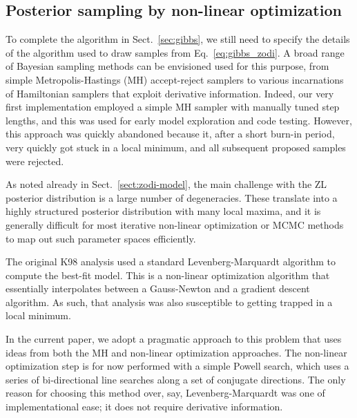 \documentclass[twocolumn]{aa}
\begin{document}
\subsection{Posterior sampling by non-linear optimization}
\label{sec:nonlin}


To complete the algorithm in Sect.~\ref{sec:gibbs}, we still need to
specify the details of the algorithm used to draw samples from
Eq.~\eqref{eq:gibbs_zodi}. A broad range of Bayesian sampling methods
can be envisioned used for this purpose, from simple
Metropolis-Hastings (MH) accept-reject samplers to various
incarnations of Hamiltonian samplers that exploit derivative
information. Indeed, our very first implementation employed a simple
MH sampler with manually tuned step lengths, and this was used for
early model exploration and code testing. However, this approach was
quickly abandoned because it, after a short burn-in period, very
quickly got stuck in a local minimum, and all subsequent proposed
samples were rejected.

As noted already in Sect.~\ref{sect:zodi-model}, the main challenge
with the ZL posterior distribution is a large number of
degeneracies. These translate into a highly structured posterior
distribution with many local maxima, and it is generally difficult for
most iterative non-linear optimization or MCMC methods to map out such
parameter spaces efficiently.

The original K98 analysis used a standard Levenberg-Marquardt
algorithm to compute the best-fit model. This is a non-linear
optimization algorithm that essentially interpolates between a
Gauss-Newton and a gradient descent algorithm. As such, that analysis
was also susceptible to getting trapped in a local minimum.

In the current paper, we adopt a pragmatic approach to this problem
that uses ideas from both the MH and non-linear optimization
approaches. The non-linear optimization step is for now performed with
a simple Powell search, which uses a series of bi-directional line
searches along a set of conjugate directions. The only reason for
choosing this method over, say, Levenberg-Marquardt was one of
implementational ease; it does not require derivative information.
\end{document}
